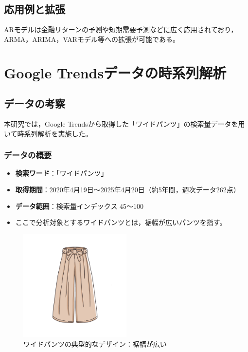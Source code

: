 \documentclass[12pt]{article}
\begin{document}
\subsection{応用例と拡張}
ARモデルは金融リターンの予測や短期需要予測などに広く応用されており，ARMA，ARIMA，VARモデル等への拡張が可能である。

\section{Google Trendsデータの時系列解析}

\subsection{データの考察}

本研究では，Google Trendsから取得した「ワイドパンツ」の検索量データを用いて時系列解析を実施した。

\subsubsection{データの概要}
\begin{itemize}
\item \textbf{検索ワード}：「ワイドパンツ」
\item \textbf{取得期間}：2020年4月19日～2025年4月20日（約5年間，週次データ262点）
\item \textbf{データ範囲}：検索量インデックス 45～100
\item ここで分析対象とするワイドパンツとは，裾幅が広いパンツを指す。
\end{itemize}

\begin{figure}[htbp]
    \centering
    \includegraphics[width=0.5\textwidth]{./static/22602788.png}
    \caption{ワイドパンツの典型的なデザイン：裾幅が広い}
    \label{fig:wide_pants_design}
\end{figure}
\end{document}
